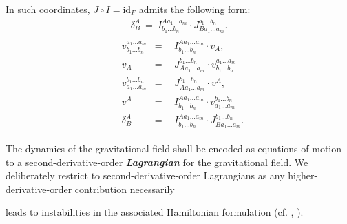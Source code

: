 \documentclass[%
 reprint,
nofootinbib,
 amsmath,amssymb,
 aps,
 prd,
floatfix,
]{revtex4-2}
\begin{document}
In such coordinates, $J\circ I = \mathrm{id}_F$ admits the following form:
\begin{align}
    \delta^A _ B \ = \ I^{A a_1 ... a_m}_{b_1 ... b_n} \cdot J^{b_1 ... b_n}_{B a_1 ... a_m}.  
\end{align}
\fi 
\begin{align} \label{interRel}
    \begin{aligned}
    & v^{a_1 ... a_m}_{b_1 ... b_n} & = & \ \ I^{A a_1 ... a_m}_{b_1 ... b_n} \cdot v_{A},\\  
    & v_A & = & \ \ J^{b_1 ... b_n}_{A a_1 ... a_m} \cdot v^{a_1 ... a_m}_{b_1 ... b_n}\\
    & v^{b_1 ... b_n}_{a_1 ... a_m} & = & \ \ J^{b_1 ... b_n}_{A a_1 ... a_m} \cdot v^{A},\\  
    & v^A & = & \ \  I^{A a_1 ... a_m}_{b_1 ... b_n} \cdot v^{b_1 ... b_n}_{a_1 ... a_m} \\
     &\delta^A _ B &  = & \ \ I^{A a_1 ... a_m}_{b_1 ... b_n} \cdot J^{b_1 ... b_n}_{B a_1 ... a_m}.  
    \end{aligned}
\end{align}

The dynamics of the gravitational field shall be encoded as equations of motion to a second-derivative-order \textit{\textbf{Lagrangian}} for the gravitational field. We deliberately restrict to second-derivative-order Lagrangians as any higher-derivative-order contribution necessarily
\iffalse
also contributes to the equations of motion in higher than second derivative order. These contributions would then, however, 
\fi
leads to instabilities in the associated Hamiltonian formulation (cf. \cite{Ostrogradsky:1850fid}, \cite{2015arXiv150602210W}). 
\end{document}
